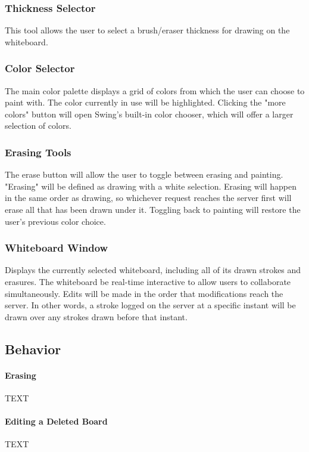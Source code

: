 \subsubsection{Thickness Selector}

This tool allows the user to select a brush/eraser thickness for drawing on the whiteboard.

\subsubsection{Color Selector}

The main color palette displays a grid of colors from which the user can choose to paint with. The color currently in use will be highlighted. Clicking the "more colors" button will open Swing's built-in color chooser, which will offer a larger selection of colors.

\subsubsection{Erasing Tools}

The erase button will allow the user to toggle between erasing and painting. "Erasing" will be defined as drawing with a white selection. Erasing will happen in the same order as drawing, so whichever request reaches the server first will erase all that has been drawn under it. Toggling back to painting will restore the user's previous color choice.

\subsubsection{Whiteboard Window}

Displays the currently selected whiteboard, including all of its drawn strokes and erasures. The whiteboard be real-time interactive to allow users to collaborate simultaneously. Edits will be made in the order that modifications reach the server. In other words, a stroke logged on the server at a specific instant will be drawn over any strokes drawn before that instant.

\subsection{Behavior}

\paragraph{Erasing} TEXT

\paragraph{Editing a Deleted Board} TEXT